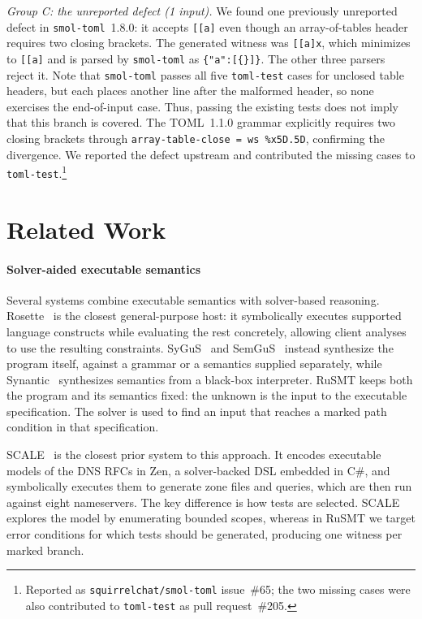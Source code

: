 \documentclass[sigconf,screen]{acmart}
\theoremstyle{definition}
\theoremstyle{remark}
\newcommand{\rusmt}{RuSMT}
\newcommand{\toml}{TOML}
\newcommand{\code}[1]{\texttt{#1}}
\newcommand{\newbugcount}{1}   %
\newcommand{\smolissue}{65}    %
\newcommand{\tomltestpr}{205} %
\begin{document}
\emph{Group C: the unreported defect (\newbugcount{} input).} We found one previously unreported defect in \code{smol-toml}~1.8.0: it accepts \code{[[a]} even though an array-of-tables header requires two closing brackets. The generated witness was \code{[[a]x}, which minimizes to \code{[[a]} and is parsed by \code{smol-toml} as \code{\{"a":[\{\}]\}}. The other three parsers reject it. Note that \code{smol-toml} passes all five \code{toml-test} cases for unclosed table headers, but each places another line after the malformed header, so none exercises the end-of-input case. Thus, passing the existing tests does not imply that this branch is covered. The \toml{}~1.1.0 grammar explicitly requires two closing brackets through \code{array-table-close = ws \%x5D.5D}, confirming the divergence. We reported the defect upstream and contributed the missing cases to \code{toml-test}.\footnote{Reported as \code{squirrelchat/smol-toml}
issue~\#\smolissue{}; the two missing cases were also contributed to
\code{toml-test} as pull request~\#\tomltestpr{}.}

\section{Related Work}
\label{sec:related}

\paragraph{Solver-aided executable semantics}
Several systems combine executable semantics with solver-based reasoning. Rosette~\cite{torlak2013rosette,torlak2014rosette} is the closest general-purpose host: it symbolically executes supported language constructs while evaluating the rest concretely, allowing client analyses to use the resulting constraints. SyGuS~\cite{alur2013sygus} and SemGuS~\cite{kim2021semgus} instead synthesize the program itself, against a grammar or a semantics supplied separately, while Synantic~\cite{liu2024synantic} synthesizes semantics from a black-box interpreter. \rusmt{} keeps both the program and its semantics fixed: the unknown is the input to the executable specification. The solver is used to find an input that reaches a marked path condition in that specification.

SCALE~\cite{kakarla2022scale} is the closest prior system to this approach. It encodes executable models of the DNS RFCs in Zen, a solver-backed DSL embedded in C\#, and symbolically executes them to generate zone files and queries, which are then run against eight nameservers. The key difference is how tests are selected. SCALE explores the model by enumerating bounded scopes, whereas in \rusmt{} we target error conditions for which tests should be generated, producing one witness per marked branch.
\end{document}
